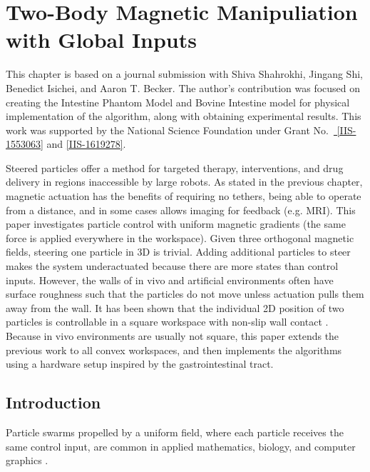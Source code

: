 \chapter[Two-Body Magnetic Manipulation with Global Inputs]{Two-Body Magnetic Manipuliation with Global Inputs}\label{chap-wallFriction}



This chapter is based on a journal submission with  Shiva Shahrokhi, Jingang Shi,  Benedict Isichei, and Aaron T. Becker.
The author's contribution was focused on creating the Intestine Phantom Model and Bovine Intestine model for physical implementation of the algorithm, along with obtaining experimental results. 
This work was supported by the National Science Foundation under Grant No.\ \href{http://nsf.gov/awardsearch/showAward?AWD_ID=1553063}{ [IIS-1553063]} and \href{http://nsf.gov/awardsearch/showAward?AWD_ID=1619278}{[IIS-1619278]}.


Steered particles offer a method for targeted therapy, interventions, and drug delivery in regions inaccessible by large robots.
As stated in the previous chapter, magnetic actuation has the benefits of requiring no tethers, being able to operate from a distance, and in some cases allows imaging for feedback (e.g. MRI).
This paper investigates particle control with uniform magnetic gradients (the same force is applied everywhere in the workspace).
Given three orthogonal magnetic fields, steering one particle in 3D is trivial. 
Adding additional particles to steer makes the system underactuated because there are more states than control inputs. 
However, the walls of in vivo and artificial environments often have surface roughness such that the particles do not move unless actuation pulls them away from the wall.
It has been shown that the individual 2D position of two particles is controllable in a square workspace with non-slip wall contact \cite{shahrokhi2017algorithms}.
Because in vivo environments are usually not square, this paper extends the previous work to all convex workspaces, and then implements the algorithms using a hardware setup inspired by the gastrointestinal tract.


\section{Introduction}\label{sec:Intro}
Particle swarms propelled by a uniform field, where each particle  receives the same control input, are common in applied mathematics, biology, and computer graphics \cite{Peyer2013,Shirai2005,Chiang2011}.


